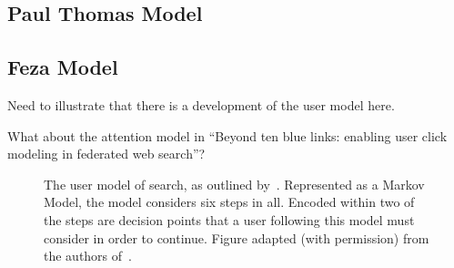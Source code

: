 \subsection{Paul Thomas Model}

\subsection{Feza Model}

Need to illustrate that there is a development of the user model here.

What about the attention model in ``Beyond ten blue links: enabling user click modeling in federated web search''?

\begin{figure}[t!]
    \centering
    \caption[Model of the search process by~\cite{baskaya2013behavioural_factors}]{The user model of search, as outlined by~\citealt{baskaya2013behavioural_factors}. Represented as a Markov Model, the model considers six steps in all. Encoded within two of the steps are decision points that a user following this model must consider in order to continue. Figure adapted (with permission) from the authors of~\citealt{baskaya2013behavioural_factors}.}
    \label{fig:baskaya_model}
\end{figure}

